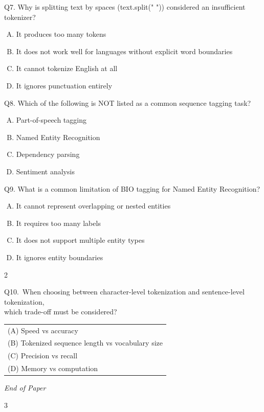 \documentclass[11pt]{article}
\begin{document}
Q7. Why is splitting text by spaces (text.split(" ")) considered an insufficient tokenizer?

\begin{enumerate}[(A)]
\item It produces too many tokens
\item It does not work well for languages without explicit word boundaries
\item It cannot tokenize English at all
\item It ignores punctuation entirely
\end{enumerate}

Q8. Which of the following is NOT listed as a common sequence tagging task?

\begin{enumerate}[(A)]
\item Part-of-speech tagging
\item Named Entity Recognition
\item Dependency parsing
\item Sentiment analysis
\end{enumerate}

Q9. What is a common limitation of BIO tagging for Named Entity Recognition?

\begin{enumerate}[(A)]
\item It cannot represent overlapping or nested entities
\item It requires too many labels
\item It does not support multiple entity types
\item It ignores entity boundaries
\end{enumerate}

\begin{center}
2
\end{center}

\clearpage

Q10.\ When choosing between character-level tokenization and sentence-level tokenization,\\
which trade-off must be considered?

\medskip

\begin{tabular}{@{}l}
(A) Speed vs accuracy \\
(B) Tokenized sequence length vs vocabulary size \\
(C) Precision vs recall \\
(D) Memory vs computation \\
\end{tabular}

\vfill

\textit{End of Paper}

\begin{center}
3
\end{center}
\end{document}
